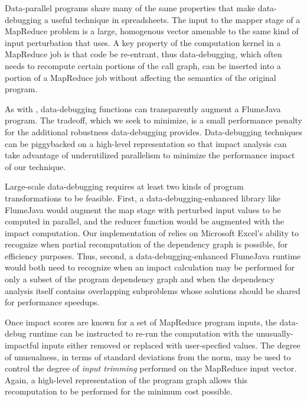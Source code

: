 Data-parallel programs share many of the same properties that make data-debugging a useful technique in spreadsheets.  The input to the mapper stage of a MapReduce problem is a large, homogenous vector amenable to the same kind of input perturbation that \checkcell{} uses.  A key property of the computation kernel in a MapReduce job is that code be re-entrant, thus data-debugging, which often needs to recompute certain portions of the call graph, can be inserted into a portion of a MapReduce job without affecting the semantics of the original program.

As with \checkcell, data-debugging functions can transparently augment a FlumeJava program.  The tradeoff, which we seek to minimize, is a small performance penalty for the additional robustness data-debugging provides. Data-debugging techniques can be piggybacked on a high-level representation so that impact analysis can take advantage of underutilized parallelism to minimize the performance impact of our technique.

Large-scale data-debugging requires at least two kinds of program transformations to be feasible.  First, a data-debugging-enhanced library like FlumeJava would augment the map stage with perturbed input values to be computed in parallel, and the reducer function would be augmented with the impact computation.  Our implementation of \checkcell relies on Microsoft Excel's ability to recognize when partial recomputation of the dependency graph is possible, for efficiency purposes.  Thus, second, a data-debugging-enhanced FlumeJava runtime would both need to recognize when an impact calculation may be performed for only a subset of the program dependency graph and when the dependency analysis itself contains overlapping subproblems whose solutions should be shared for performance speedups.

Once impact scores are known for a set of MapReduce program inputs, the data-debug runtime can be instructed to re-run the computation with the unusually-impactful inputs either removed or replaced with user-specfied values.  The degree of unusualness, in terms of standard deviations from the norm, may be used to control the degree of \emph{input trimming} performed on the MapReduce input vector.  Again, a high-level representation of the program graph allows this recomputation to be performed for the minimum cost possible.